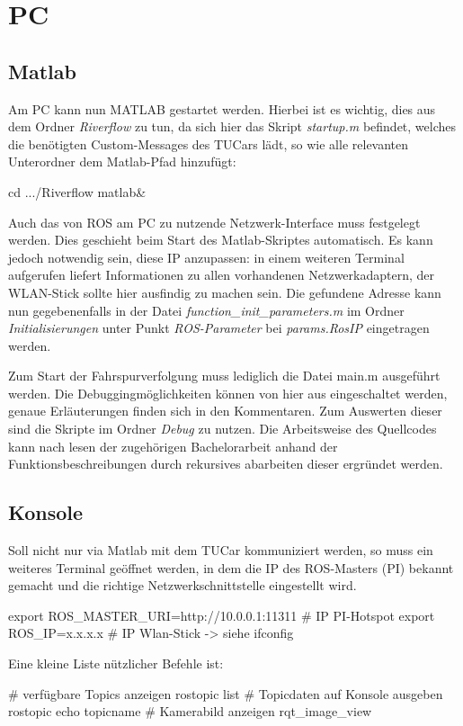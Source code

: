 \documentclass[
	11pt,			%
	a4paper,		%
	twoside,		%
	german,			%
	titlepage		%
]{scrartcl}			%
\newcommand{\sh}[1]{\mint[xleftmargin=2em]{shell}{#1}}
\begin{document}
\section{PC}
\subsection{Matlab}
Am PC kann nun MATLAB gestartet werden. Hierbei ist es wichtig, dies aus dem Ordner \emph{Riverflow} zu tun, da sich hier das Skript \emph{startup.m} befindet, welches die benötigten Custom-Messages des TUCars lädt, so wie alle relevanten Unterordner dem Matlab-Pfad hinzufügt:
\begin{she}
cd .../Riverflow
matlab&
\end{she}

Auch das von ROS am PC zu nutzende Netzwerk-Interface muss festgelegt werden. Dies geschieht beim Start des Matlab-Skriptes automatisch. Es kann jedoch notwendig sein, diese IP anzupassen:
\sh{ifconfig} 
\noindent in einem weiteren Terminal aufgerufen liefert Informationen zu allen vorhandenen Netzwerkadaptern, der WLAN-Stick sollte hier ausfindig zu machen sein.
Die gefundene Adresse kann nun gegebenenfalls in der Datei \emph{function\_init\_parameters.m} im Ordner \emph{Initialisierungen} unter Punkt \emph{ROS-Parameter} bei \emph{params.RosIP} eingetragen werden.

Zum Start der Fahrspurverfolgung muss lediglich die Datei main.m ausgeführt werden. Die Debuggingmöglichkeiten können von hier aus eingeschaltet werden, genaue Erläuterungen finden sich in den Kommentaren. Zum Auswerten dieser sind die Skripte im Ordner \emph{Debug} zu nutzen. Die Arbeitsweise des Quellcodes kann nach lesen der zugehörigen Bachelorarbeit anhand der Funktionsbeschreibungen durch rekursives abarbeiten dieser ergründet werden.

\subsection{Konsole}
Soll nicht nur via Matlab mit dem TUCar kommuniziert werden, so muss ein weiteres Terminal geöffnet werden, in dem die IP des ROS-Masters (PI) bekannt gemacht und die richtige Netzwerkschnittstelle eingestellt wird.
\begin{she}
export ROS_MASTER_URI=http://10.0.0.1:11311 # IP PI-Hotspot
export ROS_IP=x.x.x.x # IP Wlan-Stick -> siehe ifconfig
\end{she}
\noindent Eine kleine Liste nützlicher Befehle ist:
\begin{she}
# verfügbare Topics anzeigen
rostopic list
# Topicdaten auf Konsole ausgeben
rostopic echo topicname
# Kamerabild anzeigen
rqt_image_view
\end{she}
\end{document}
